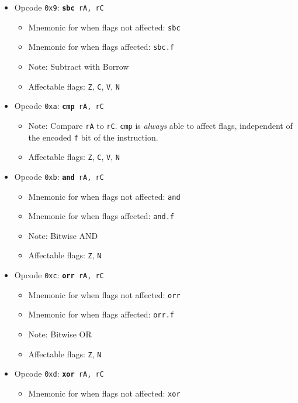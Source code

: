 \documentclass{article}
\begin{document}
\begin{itemize}
\begin{itemize}
		\end{itemize}
		\item Opcode \texttt{0x9}:
			\texttt{\textbf{sbc} rA, rC}
		\begin{itemize}
			\item Mnemonic for when flags not affected:  \texttt{sbc}
			\item Mnemonic for when flags affected:  \texttt{sbc.f}
			\item Note:  Subtract with Borrow
			\item Affectable flags:
				\texttt{Z}, \texttt{C}, \texttt{V}, \texttt{N}
		\end{itemize}
		\item Opcode \texttt{0xa}:
			\texttt{\textbf{cmp} rA, rC}
		\begin{itemize}
			\item Note:  Compare \texttt{rA} to \texttt{rC}.  \texttt{cmp}
			is \textit{always} able to affect flags, independent of the
			encoded \texttt{f} bit of the instruction.
			\item Affectable flags:
				\texttt{Z}, \texttt{C}, \texttt{V}, \texttt{N}
		\end{itemize}
		\item Opcode \texttt{0xb}:
			\texttt{\textbf{and} rA, rC}
		\begin{itemize}
			\item Mnemonic for when flags not affected:  \texttt{and}
			\item Mnemonic for when flags affected:  \texttt{and.f}
			\item Note:  Bitwise AND
			\item Affectable flags:
				\texttt{Z}, \texttt{N}
		\end{itemize}
		\item Opcode \texttt{0xc}:
			\texttt{\textbf{orr} rA, rC}
		\begin{itemize}
			\item Mnemonic for when flags not affected:  \texttt{orr}
			\item Mnemonic for when flags affected:  \texttt{orr.f}
			\item Note:  Bitwise OR
			\item Affectable flags:
				\texttt{Z}, \texttt{N}
		\end{itemize}
		\item Opcode \texttt{0xd}:
			\texttt{\textbf{xor} rA, rC}
		\begin{itemize}
			\item Mnemonic for when flags not affected:  \texttt{xor}

\end{itemize}
\end{itemize}
\end{document}
